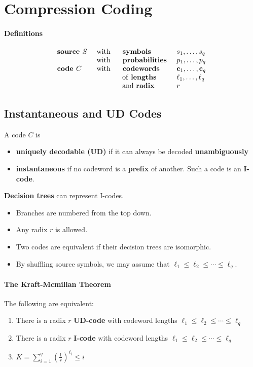 \section{Compression Coding}

\paragraph{Definitions}
\[
    \begin{array}{l l l l}
        \textbf{source } S & \text{ with } & \textbf{ symbols }          & s_1, \dots, s_q       \\
                           & \text{ with } & \textbf{ probabilities }    & p_1, \dots, p_q       \\
        \textbf{code } C   & \text{ with } & \textbf{ codewords }        & \mathbf{c}_1, \dots, \mathbf{c}_q   \\
                           &               & \text{ of \textbf{lengths}} & \ell_1, \dots, \ell_q \\
                           &               & \text{ and \textbf{radix}}  & r
    \end{array}
\]

\subsection{Instantaneous and UD Codes}
A code \(C\) is
\begin{itemize}
    \item \textbf{uniquely decodable (UD)} if it can always be decoded \textbf{unambiguously}
    \item \textbf{instantaneous} if no codeword is a \textbf{prefix} of another. Such a code is an \textbf{I-code}.
\end{itemize}

\textbf{Decision trees} can represent I-codes.
\begin{itemize}
    \item Branches are numbered from the top down.
    \item Any radix \(r\) is allowed.
    \item Two codes are equivalent if their decision trees are isomorphic.
    \item By shuffling source symbols, we may assume that \(\ell_1 \leq \ell_2 \leq \cdots \leq \ell_q\).
\end{itemize}

\paragraph{The Kraft-Mcmillan Theorem}
The following are equivalent:
\begin{enumerate}
    \item There is a radix \(r\) \textbf{UD-code} with codeword lengths \(\ell_1 \leq \ell_2 \leq \cdots \leq \ell_q\)
    \item There is a radix \(r\) \textbf{I-code} with codeword lengths \(\ell_1 \leq \ell_2 \leq \cdots \leq \ell_q\)
    \item \(K = \sum_{i=1}^q (\frac{1}{r})^{\ell_i} \leq i\)
\end{enumerate}

